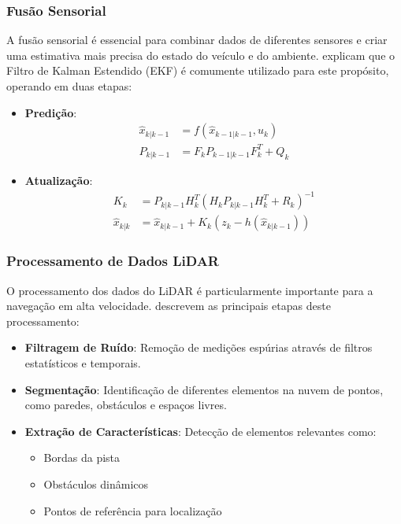 \subsubsection{Fusão Sensorial}

A fusão sensorial é essencial para combinar dados de diferentes sensores e
criar uma estimativa mais precisa do estado do veículo e do ambiente.
\cite{Babu2020Simulator} explicam que o Filtro de Kalman Estendido (EKF) é
comumente utilizado para este propósito, operando em duas etapas:

\begin{itemize}
    \item \textbf{Predição}:
          \begin{align}
              \hat{x}_{k|k-1} & = f(\hat{x}_{k-1|k-1}, u_k)   \\
              P_{k|k-1}       & = F_k P_{k-1|k-1} F_k^T + Q_k
          \end{align}

    \item \textbf{Atualização}:
          \begin{align}
              K_k           & = P_{k|k-1} H_k^T (H_k P_{k|k-1} H_k^T + R_k)^{-1} \\
              \hat{x}_{k|k} & = \hat{x}_{k|k-1} + K_k(z_k - h(\hat{x}_{k|k-1}))
          \end{align}
\end{itemize}

\subsubsection{Processamento de Dados LiDAR}

O processamento dos dados do LiDAR é particularmente importante para a
navegação em alta velocidade. \cite{Wang2020LMPC} descrevem as principais
etapas deste processamento:

\begin{itemize}
    \item \textbf{Filtragem de Ruído}: Remoção de medições espúrias através de filtros estatísticos e temporais.
    \item \textbf{Segmentação}: Identificação de diferentes elementos na nuvem de pontos, como paredes, obstáculos e espaços livres.
    \item \textbf{Extração de Características}: Detecção de elementos relevantes como:
          \begin{itemize}
              \item Bordas da pista
              \item Obstáculos dinâmicos
              \item Pontos de referência para localização
          \end{itemize}
\end{itemize}

